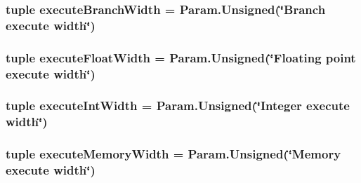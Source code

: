 \label{classSimpleOzoneCPU_1_1SimpleOzoneCPU_a52dc575e0588181eb7c3bd1e3d803cfd}
\hypertarget{classSimpleOzoneCPU_1_1SimpleOzoneCPU_a85784e938a57b92cd9d1eeaaca8500b1}{
\subsubsection[{executeBranchWidth}]{\setlength{\rightskip}{0pt plus 5cm}tuple {\bf executeBranchWidth} = Param.Unsigned(\char`\"{}Branch execute {\bf width}\char`\"{})}}
\label{classSimpleOzoneCPU_1_1SimpleOzoneCPU_a85784e938a57b92cd9d1eeaaca8500b1}
\hypertarget{classSimpleOzoneCPU_1_1SimpleOzoneCPU_a29617aaf82ccd8820fe66dd71d954fee}{
\subsubsection[{executeFloatWidth}]{\setlength{\rightskip}{0pt plus 5cm}tuple {\bf executeFloatWidth} = Param.Unsigned(\char`\"{}Floating point execute {\bf width}\char`\"{})}}
\label{classSimpleOzoneCPU_1_1SimpleOzoneCPU_a29617aaf82ccd8820fe66dd71d954fee}
\hypertarget{classSimpleOzoneCPU_1_1SimpleOzoneCPU_a0231660f86020f1dddc6d827aed5a711}{
\subsubsection[{executeIntWidth}]{\setlength{\rightskip}{0pt plus 5cm}tuple {\bf executeIntWidth} = Param.Unsigned(\char`\"{}Integer execute {\bf width}\char`\"{})}}
\label{classSimpleOzoneCPU_1_1SimpleOzoneCPU_a0231660f86020f1dddc6d827aed5a711}
\hypertarget{classSimpleOzoneCPU_1_1SimpleOzoneCPU_a4251b67a387181c64371cc3f1bed89e7}{
\subsubsection[{executeMemoryWidth}]{\setlength{\rightskip}{0pt plus 5cm}tuple {\bf executeMemoryWidth} = Param.Unsigned(\char`\"{}Memory execute {\bf width}\char`\"{})}}
